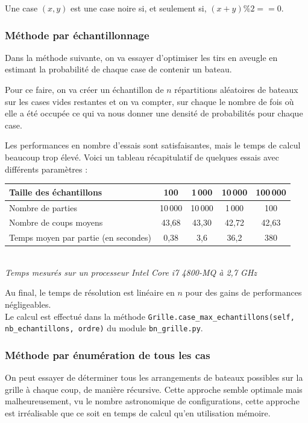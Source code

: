 Une case $(x,y)$ est une case noire si, et seulement si, $(x+y)\%2==0$.

\subsubsection{Méthode par échantillonnage}
Dans la méthode suivante, on va essayer d'optimiser les tirs en aveugle en estimant la probabilité de chaque case de contenir un bateau.

Pour ce faire, on va créer un échantillon de $n$ répartitions aléatoires de bateaux sur les cases vides restantes et on va compter, sur chaque le nombre de fois où elle a été occupée ce qui va nous donner une densité de probabilités pour chaque case. 

Les performances en nombre d'essais sont satisfaisantes, mais le temps de calcul beaucoup trop élevé. Voici un tableau récapitulatif de quelques essais avec différents paramètres :

\medskip

\begin{center}
\begin{tabular}{|l|c|c|c|c|}
\hline
Taille des échantillons & 100 & 1\,000 & 10\,000 & 100\,000\\
\hline
Nombre de parties & 10\,000 & 10\,000 & 1\,000 & 100\\
\hline
Nombre de coups moyens & 43,68 & 43,30 & 42,72 & 42,63\\
\hline
Temps moyen par partie (en secondes) & 0,38 & 3,6 & 36,2 & 380\\
\hline 
\end{tabular}\\
\vspace*{0.1cm}
\textit{Temps mesurés sur un processeur Intel Core i7 4800-MQ à 2,7 GHz}
\end{center}

\medskip

Au final, le temps de résolution est linéaire en $n$ pour des gains de performances négligeables.\\ Le calcul est effectué dans la méthode \texttt{Grille.case\_max\_echantillons(self, nb\_echantillons, ordre)} du module \texttt{bn\_grille.py}.

\subsubsection{Méthode par énumération de tous les cas}

On peut essayer de déterminer tous les arrangements de bateaux possibles sur la grille à chaque coup, de manière récursive. Cette approche semble optimale mais malheureusement, vu le nombre astronomique de configurations, cette approche est irréalisable que ce soit en temps de calcul qu'en utilisation mémoire. 

